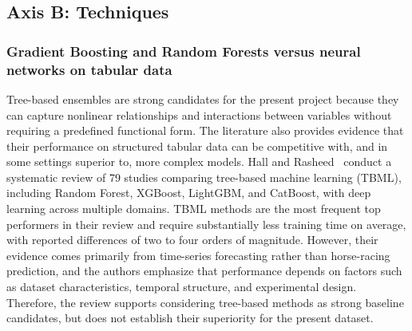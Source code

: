 \subsection{Axis B: Techniques}
\label{sec:ejeB}

\subsubsection*{\textbf{Gradient Boosting and Random Forests versus neural networks on tabular
data}} Tree-based ensembles are strong candidates for the present project because
they can capture nonlinear relationships and interactions between variables
without requiring a predefined functional form. The literature also provides
evidence that their performance on structured tabular data can be competitive
with, and in some settings superior to, more complex models. Hall and
Rasheed~\cite{ejeB_hall2025} conduct a systematic review of 79 studies comparing
tree-based machine learning (TBML), including Random Forest, XGBoost, LightGBM,
and CatBoost, with deep learning across multiple domains. TBML methods are the
most frequent top performers in their review and require substantially less
training time on average, with reported differences of two to four orders of
magnitude. However, their evidence comes primarily from time-series forecasting
rather than horse-racing prediction, and the authors emphasize that performance
depends on factors such as dataset characteristics, temporal structure, and
experimental design. Therefore, the review supports considering tree-based
methods as strong baseline candidates, but does not establish their superiority
for the present dataset.

